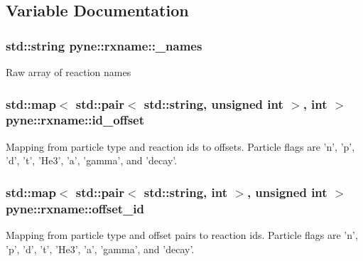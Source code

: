\subsection{Variable Documentation}
\hypertarget{namespacepyne_1_1rxname_a880e1a059fe54b6fd425cc3319978555}{
\subsubsection[{\+\_\+names}]{\setlength{\rightskip}{0pt plus 5cm}std\+::string pyne\+::rxname\+::\+\_\+names}}\label{namespacepyne_1_1rxname_a880e1a059fe54b6fd425cc3319978555}
Raw array of reaction names \hypertarget{namespacepyne_1_1rxname_ae2f5760c11dc39df3f90fbcc6584c95c}{
\subsubsection[{id\+\_\+offset}]{\setlength{\rightskip}{0pt plus 5cm}std\+::map$<$ std\+::pair$<$ std\+::string, unsigned int $>$, int $>$ pyne\+::rxname\+::id\+\_\+offset}}\label{namespacepyne_1_1rxname_ae2f5760c11dc39df3f90fbcc6584c95c}
Mapping from particle type and reaction ids to offsets. Particle flags are 'n', 'p', 'd', 't', 'He3', 'a', 'gamma', and 'decay'. \hypertarget{namespacepyne_1_1rxname_a699be84310dad599582278e04135326e}{
\subsubsection[{offset\+\_\+id}]{\setlength{\rightskip}{0pt plus 5cm}std\+::map$<$ std\+::pair$<$ std\+::string, int $>$, unsigned int $>$ pyne\+::rxname\+::offset\+\_\+id}}\label{namespacepyne_1_1rxname_a699be84310dad599582278e04135326e}
Mapping from particle type and offset pairs to reaction ids. Particle flags are 'n', 'p', 'd', 't', 'He3', 'a', 'gamma', and 'decay'. 